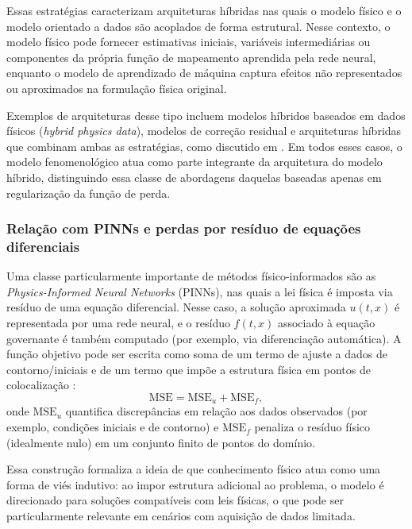 Essas estratégias caracterizam arquiteturas híbridas nas quais o
modelo físico e o modelo orientado a dados são acoplados de forma
estrutural. Nesse contexto, o modelo físico pode fornecer estimativas
iniciais, variáveis intermediárias ou componentes da própria função
de mapeamento aprendida pela rede neural, enquanto o modelo de
aprendizado de máquina captura efeitos não representados ou
aproximados na formulação física original.

Exemplos de arquiteturas desse tipo incluem modelos híbridos baseados
em dados físicos (\textit{hybrid physics data}), modelos de correção
residual e arquiteturas híbridas que combinam ambas as estratégias,
como discutido em \cite{zhou2025physics}. Em todos esses casos, o
modelo fenomenológico atua como parte integrante da arquitetura do
modelo híbrido, distinguindo essa classe de abordagens daquelas
baseadas apenas em regularização da função de perda.
\subsubsection{Relação com PINNs e perdas por resíduo de equações diferenciais}
\label{subsec:pinns}

Uma classe particularmente importante de métodos físico-informados são as \textit{Physics-Informed Neural Networks} (PINNs), nas quais a lei física é imposta via resíduo de uma equação diferencial. Nesse caso, a solução aproximada $u(t,x)$ é representada por uma rede neural, e o resíduo $f(t,x)$ associado à equação governante é também computado (por exemplo, via diferenciação automática). A função objetivo pode ser escrita como soma de um termo de ajuste a dados de contorno/iniciais e de um termo que impõe a estrutura física em pontos de colocalização \cite{raissi2019pinn}:
\begin{equation}
\label{eq:loss_pinn}
\mathrm{MSE}
=
\mathrm{MSE}_u + \mathrm{MSE}_f,
\end{equation}
onde $\mathrm{MSE}_u$ quantifica discrepâncias em relação aos dados observados (por exemplo, condições iniciais e de contorno) e $\mathrm{MSE}_f$ penaliza o resíduo físico (idealmente nulo) em um conjunto finito de pontos do domínio.

Essa construção formaliza a ideia de que conhecimento físico atua como uma forma de viés indutivo: ao impor estrutura adicional ao problema, o modelo é direcionado para soluções compatíveis com leis físicas, o que pode ser particularmente relevante em cenários com aquisição de dados limitada.

